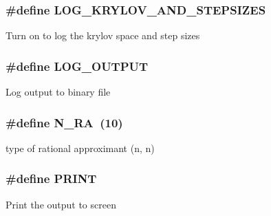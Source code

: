 \subsubsection[{\texorpdfstring{L\+O\+G\+\_\+\+K\+R\+Y\+L\+O\+V\+\_\+\+A\+N\+D\+\_\+\+S\+T\+E\+P\+S\+I\+Z\+ES}{LOG_KRYLOV_AND_STEPSIZES}}]{\setlength{\rightskip}{0pt plus 5cm}\#define L\+O\+G\+\_\+\+K\+R\+Y\+L\+O\+V\+\_\+\+A\+N\+D\+\_\+\+S\+T\+E\+P\+S\+I\+Z\+ES}\hypertarget{solver__options_8cuh_a2adffa059bbd6f183ff7f63db602ac42}{}\label{solver__options_8cuh_a2adffa059bbd6f183ff7f63db602ac42}
Turn on to log the krylov space and step sizes 
\subsubsection[{\texorpdfstring{L\+O\+G\+\_\+\+O\+U\+T\+P\+UT}{LOG_OUTPUT}}]{\setlength{\rightskip}{0pt plus 5cm}\#define L\+O\+G\+\_\+\+O\+U\+T\+P\+UT}\hypertarget{solver__options_8cuh_ac786f5f1963363a48eed565f7cbc6931}{}\label{solver__options_8cuh_ac786f5f1963363a48eed565f7cbc6931}
Log output to binary file 
\subsubsection[{\texorpdfstring{N\+\_\+\+RA}{N_RA}}]{\setlength{\rightskip}{0pt plus 5cm}\#define N\+\_\+\+RA~(10)}\hypertarget{solver__options_8cuh_a69f5533c684b73d07a7e20146a285cb1}{}\label{solver__options_8cuh_a69f5533c684b73d07a7e20146a285cb1}
type of rational approximant (n, n) 
\subsubsection[{\texorpdfstring{P\+R\+I\+NT}{PRINT}}]{\setlength{\rightskip}{0pt plus 5cm}\#define P\+R\+I\+NT}\hypertarget{solver__options_8cuh_a8b43bafee90b30676faae508c21cb8d7}{}\label{solver__options_8cuh_a8b43bafee90b30676faae508c21cb8d7}
Print the output to screen 

